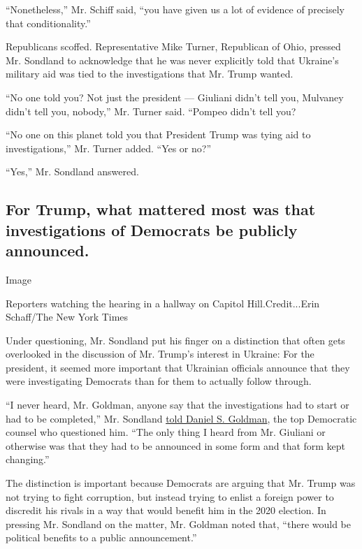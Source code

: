 ``Nonetheless,'' Mr. Schiff said, ``you have given us a lot of evidence
of precisely that conditionality.''

Republicans scoffed. Representative Mike Turner, Republican of Ohio,
pressed Mr. Sondland to acknowledge that he was never explicitly told
that Ukraine's military aid was tied to the investigations that Mr.
Trump wanted.

``No one told you? Not just the president --- Giuliani didn't tell you,
Mulvaney didn't tell you, nobody,'' Mr. Turner said. ``Pompeo didn't
tell you?

``No one on this planet told you that President Trump was tying aid to
investigations,'' Mr. Turner added. ``Yes or no?''

``Yes,'' Mr. Sondland answered.

\hypertarget{for-trump-what-mattered-most-was-that-investigations-of-democrats-be-publicly-announced}{%
\subsection{For Trump, what mattered most was that investigations of
Democrats be publicly
announced.}\label{for-trump-what-mattered-most-was-that-investigations-of-democrats-be-publicly-announced}}

Image

Reporters watching the hearing in a hallway on Capitol
Hill.Credit...Erin Schaff/The New York Times

Under questioning, Mr. Sondland put his finger on a distinction that
often gets overlooked in the discussion of Mr. Trump's interest in
Ukraine: For the president, it seemed more important that Ukrainian
officials announce that they were investigating Democrats than for them
to actually follow through.

``I never heard, Mr. Goldman, anyone say that the investigations had to
start or had to be completed,'' Mr. Sondland
\href{https://www.nytimes.com/2019/11/19/us/politics/house-impeachment-lawyers-goldman-castor.html}{told
Daniel S. Goldman}, the top Democratic counsel who questioned him. ``The
only thing I heard from Mr. Giuliani or otherwise was that they had to
be announced in some form and that form kept changing.''

The distinction is important because Democrats are arguing that Mr.
Trump was not trying to fight corruption, but instead trying to enlist a
foreign power to discredit his rivals in a way that would benefit him in
the 2020 election. In pressing Mr. Sondland on the matter, Mr. Goldman
noted that, ``there would be political benefits to a public
announcement.''


